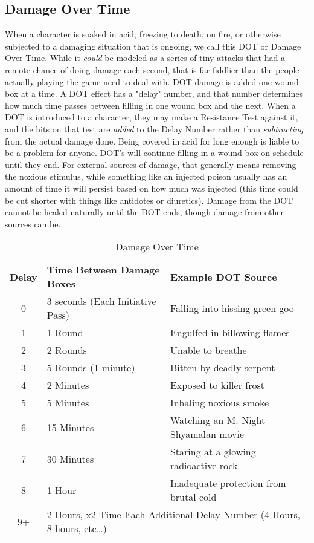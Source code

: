 \subsection{Damage Over Time} \label{subsection:Damage-Over-Time}

When a character is soaked in acid, freezing to death, on fire, or otherwise subjected to a damaging situation that is ongoing, we call this DOT or Damage Over Time. While it \textit{could} be modeled as a series of tiny attacks that had a remote chance of doing damage each second, that is far fiddlier than the people actually playing the game need to deal with. DOT damage is added one wound box at a time. A DOT effect has a "delay" number, and that number determines how much time passes between filling in one wound box and the next. When a DOT is introduced to a character, they may make a Resistance Test against it, and the hits on that test are \textit{added} to the Delay Number rather than \textit{subtracting} from the actual damage done. Being covered in acid for long enough is liable to be a problem for anyone. DOT's will continue filling in a wound box on schedule until they end. For external sources of damage, that generally means removing the noxious stimulus, while something like an injected poison usually has an amount of time it will persist based on how much was injected (this time could be cut shorter with things like antidotes or diuretics). Damage from the DOT cannot be healed naturally until the DOT ends, though damage from other sources can be.

\begin{table}[htb] 
\caption{Damage Over Time} \centering
\begin{tabular}{c l l}
\textbf{Delay}&\textbf{Time Between Damage Boxes}&\textbf{Example DOT Source} \\
0 & 3 seconds (Each Initiative Pass) & Falling into hissing green goo \\
1 & 1 Round & Engulfed in billowing flames \\
2 & 2 Rounds & Unable to breathe \\
3 & 5 Rounds (1 minute) & Bitten by deadly serpent \\
4 & 2 Minutes & Exposed to killer frost \\
5 & 5 Minutes & Inhaling noxious smoke \\
6 & 15 Minutes & Watching an M. Night Shyamalan movie \\
7 & 30 Minutes & Staring at a glowing radioactive rock \\
8 & 1 Hour & Inadequate protection from brutal cold \\
9+ & \multicolumn{2}{l}{2 Hours, x2 Time Each Additional Delay Number (4 Hours, 8 hours, etc\ldots{})} \\
\end{tabular}
\end{table}

